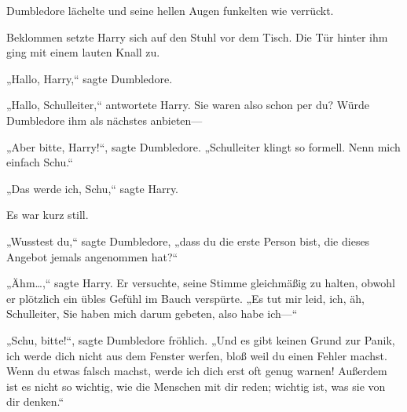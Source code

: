 Dumbledore lächelte und seine hellen Augen funkelten wie verrückt.

Beklommen setzte Harry sich auf den Stuhl vor dem Tisch. Die Tür hinter ihm ging mit einem lauten Knall zu.

„Hallo, Harry,“ sagte Dumbledore.

„Hallo, Schulleiter,“ antwortete Harry. Sie waren also schon per du? Würde Dumbledore ihm als nächstes anbieten—

„Aber bitte, Harry!“, sagte Dumbledore. „Schulleiter klingt so formell. Nenn mich einfach Schu.“

„Das werde ich, Schu,“ sagte Harry.

Es war kurz still.

„Wusstest du,“ sagte Dumbledore, „dass du die erste Person bist, die dieses Angebot jemals angenommen hat?“

„Ähm…,“ sagte Harry. Er versuchte, seine Stimme gleichmäßig zu halten, obwohl er plötzlich ein übles Gefühl im Bauch verspürte. „Es tut mir leid, ich, äh, Schulleiter, Sie haben mich darum gebeten, also habe ich—“

„Schu, bitte!“, sagte Dumbledore fröhlich. „Und es gibt keinen Grund zur Panik, ich werde dich nicht aus dem Fenster werfen, bloß weil du einen Fehler machst. Wenn du etwas falsch machst, werde ich dich erst oft genug warnen! Außerdem ist es nicht so wichtig, wie die Menschen mit dir reden; wichtig ist, was sie von dir denken.“


